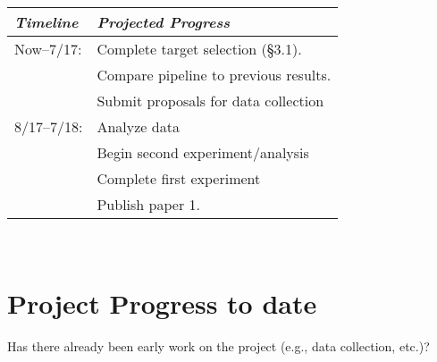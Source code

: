\documentclass[11pt, preprint, flushrt]{aastex-numbers}
\begin{document}
\vskip0.13in
\noindent\begin{tabular}{ll}
 \hline \hline{\em Timeline} & {\em Projected Progress} \\\hline \hline
Now--7/17:&  Complete target selection (\S 3.1).\\
               &  {\color{blue} Compare pipeline to previous results.} \\
                 &  {\color{ForestGreen} Submit proposals for
                   data collection}  \\\hline


8/17--7/18: &  {\color{blue} Analyze data}  \\
                &  {\color{ForestGreen} Begin second experiment/analysis}  \\
               &  {\color{Orange}  Complete first experiment}\\
                &   Publish paper 1.\\ \hline

\end{tabular}\\\vskip0.05in



\vspace{-0.2in}
\section{Project Progress to date}\vskip-0.05in

Has there already been early work on the project (e.g., data collection, etc.)?


\clearpage
% 
 

\end{document}
